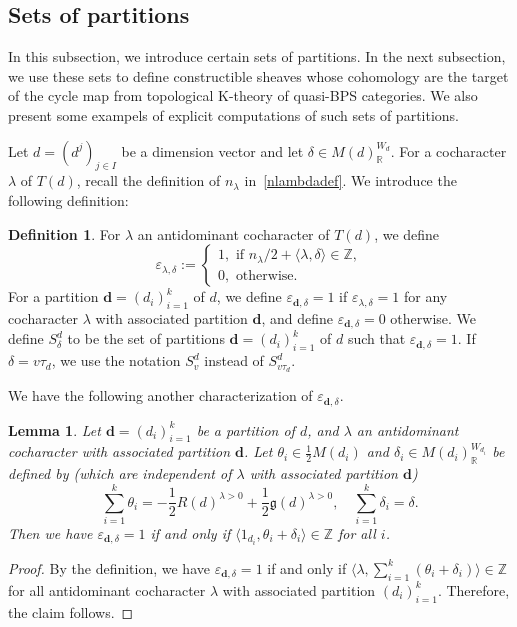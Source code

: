 \documentclass [11pt,oneside,a4paper,mathscr]{amsart}
\newtheorem{lemma}[thm]{Lemma}
\theoremstyle{definition}
\newtheorem{defn}[thm]{Definition}
\begin{document}
\subsection{Sets of partitions}\label{subsec612}
In this subsection, we introduce certain sets of partitions. In the next subsection, we use these sets to define constructible sheaves whose cohomology are the target of the cycle map from topological K-theory of quasi-BPS categories. We also present some exampels of explicit computations of such sets of partitions.

Let $d=(d^j)_{j\in I}$ be a dimension vector
and let $\delta \in M(d)_{\mathbb{R}}^{W_d}$. 
For a cocharacter $\lambda$ of $T(d)$, recall 
the definition of $n_{\lambda}$ in~\eqref{nlambdadef}. 
We introduce the following definition: 
\begin{defn}
For $\lambda$ an antidominant cocharacter of $T(d)$, we define 
\begin{equation}\label{varepsilondeltalambda}
\varepsilon_{\lambda, \delta}:=\begin{cases}
1,\text{ if }n_\lambda/2+\langle \lambda, \delta\rangle\in\mathbb{Z},\\
0, \text{ otherwise}.
\end{cases}
\end{equation}
For a partition $\mathbf{d}=(d_i)_{i=1}^k$ of $d$, we define $\varepsilon_{\mathbf{d}, \delta}=1$ if $\varepsilon_{\lambda, \delta}=1$ for any cocharacter $\lambda$ with associated partition $\mathbf{d}$, and define $\varepsilon_{\mathbf{d}, \delta}=0$ otherwise.
We define $S^d_\delta$ to be the set of partitions $\mathbf{d}=(d_i)_{i=1}^k$ of $d$
such that $\varepsilon_{\mathbf{d}, \delta}=1$. If $\delta=v\tau_d$, we use the notation $S^d_v$ instead of $S^d_{v\tau_d}$.
\end{defn}
We have the following another 
characterization of $\varepsilon_{\mathbf{d}, \delta}$. 
\begin{lemma}\label{lem:epsilon}
Let $\mathbf{d}=(d_i)_{i=1}^k$ be a partition of $d$, and $\lambda$ an antidominant cocharacter 
with associated partition $\mathbf{d}$. 
Let $\theta_i\in \frac{1}{2}M(d_i)$ and $\delta_i \in M(d_i)_{\mathbb{R}}^{W_{d_i}}$ be defined 
by (which are independent of $\lambda$ with associated partition $\mathbf{d}$)
\[\sum_{i=1}^k \theta_i=-\frac{1}{2}R(d)^{\lambda>0}+\frac{1}{2}\mathfrak{g}(d)^{\lambda>0}, \quad 
\sum_{i=1}^k \delta_{i}=\delta.\]
Then we have $\varepsilon_{\mathbf{d}, \delta}=1$ if 
and only if $\langle 1_{d_i}, \theta_i+\delta_i \rangle \in \mathbb{Z}$ for all $i$. 
\end{lemma}
\begin{proof}
    By the definition, we have 
    $\varepsilon_{\mathbf{d}, \delta}=1$ if and only 
    if 
    $\langle \lambda, \sum_{i=1}^k (\theta_i+\delta_i)\rangle \in \mathbb{Z}$
    for all antidominant cocharacter $\lambda$
    with associated partition $(d_i)_{i=1}^k$. 
    Therefore, the claim follows. 
\end{proof}
\end{document}
